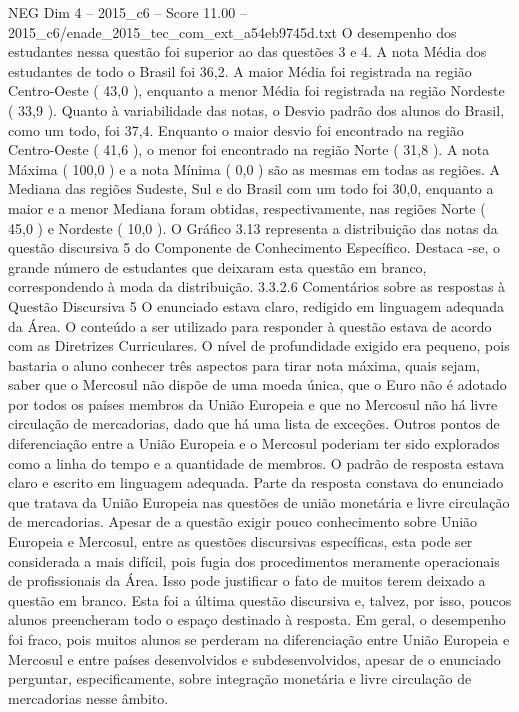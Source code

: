 \begin{textsample}{NEG Dim 4 – 2015\_c6 – Score 11.00 – 2015\_c6/enade\_2015\_tec\_com\_ext\_a54eb9745d.txt}
O desempenho dos estudantes nessa questão foi superior ao das questões 3 e 4.
A nota Média dos estudantes de todo o Brasil foi 36,2.
A maior Média foi registrada na região Centro-Oeste ( 43,0 ), enquanto a menor Média foi registrada na região Nordeste ( 33,9 ).
Quanto à variabilidade das notas, o Desvio padrão dos alunos do Brasil, como um todo, foi 37,4.
Enquanto o maior desvio foi encontrado na região Centro-Oeste ( 41,6 ), o menor foi encontrado na região Norte ( 31,8 ).
A nota Máxima ( 100,0 ) e a nota Mínima ( 0,0 ) são as mesmas em todas as regiões.
A Mediana das regiões Sudeste, Sul e do Brasil com um todo foi 30,0, enquanto a maior e a menor Mediana foram obtidas, respectivamente, nas regiões Norte ( 45,0 ) e Nordeste ( 10,0 ).
O Gráfico 3.13 representa a distribuição das notas da questão discursiva 5 do Componente de Conhecimento Específico.
Destaca -se, o grande número de estudantes que deixaram esta questão em branco, correspondendo à moda da distribuição. 3.3.2.6 Comentários sobre as respostas à Questão Discursiva 5 O enunciado estava claro, redigido em linguagem adequada da Área.
O conteúdo a ser utilizado para responder à questão estava de acordo com as Diretrizes Curriculares.
O nível de profundidade exigido era pequeno, pois bastaria o aluno conhecer três aspectos para tirar nota máxima, quais sejam, saber que o Mercosul não dispõe de uma moeda única, que o Euro não é adotado por todos os países membros da União Europeia e que no Mercosul não há livre circulação de mercadorias, dado que há uma lista de exceções.
Outros pontos de diferenciação entre a União Europeia e o Mercosul poderiam ter sido explorados como a linha do tempo e a quantidade de membros.
O padrão de resposta estava claro e escrito em linguagem adequada.
Parte da resposta constava do enunciado que tratava da União Europeia nas questões de união monetária e livre circulação de mercadorias.
Apesar de a questão exigir pouco conhecimento sobre União Europeia e Mercosul, entre as questões discursivas específicas, esta pode ser considerada a mais difícil, pois fugia dos procedimentos meramente operacionais de profissionais da Área.
Isso pode justificar o fato de muitos terem deixado a questão em branco.
Esta foi a última questão discursiva e, talvez, por isso, poucos alunos preencheram todo o espaço destinado à resposta.
Em geral, o desempenho foi fraco, pois muitos alunos se perderam na diferenciação entre União Europeia e Mercosul e entre países desenvolvidos e subdesenvolvidos, apesar de o enunciado perguntar, especificamente, sobre integração monetária e livre circulação de mercadorias nesse âmbito.

\end{textsample}
